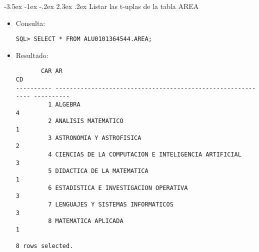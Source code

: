 \documentclass[11pt]{report}
\makeatletter
\renewcommand\chapter{\@startsection{chapter}{0}{\z@}%
    {-3.5ex \@plus -1ex \@minus -.2ex}%
    {2.3ex \@plus.2ex}%
    {\normalfont\Large\bfseries}}
\makeatother
\begin{document}
\chapter{Listar las t-uplas de la tabla AREA}
\begin{itemize}
  \item Consulta:
  \begin{verbatim}
SQL> SELECT * FROM ALU0101364544.AREA;
  \end{verbatim}
  \item{Resultado:}
  \begin{verbatim}
       CAR AR                                                                   CD                                                                                                                      
---------- ------------------------------------------------------------ ----------                                                                                                                      
         1 ALGEBRA                                                               4                                                                                                                      
         2 ANALISIS MATEMATICO                                                   1                                                                                                                      
         3 ASTRONOMIA Y ASTROFISICA                                              2                                                                                                                      
         4 CIENCIAS DE LA COMPUTACION E INTELIGENCIA ARTIFICIAL                  3                                                                                                                      
         5 DIDACTICA DE LA MATEMATICA                                            1                                                                                                                      
         6 ESTADISTICA E INVESTIGACION OPERATIVA                                 3                                                                                                                      
         7 LENGUAJES Y SISTEMAS INFORMATICOS                                     3                                                                                                                      
         8 MATEMATICA APLICADA                                                   1                                                                                                                      

8 rows selected.
  \end{verbatim}
\end{itemize}
\end{document}
